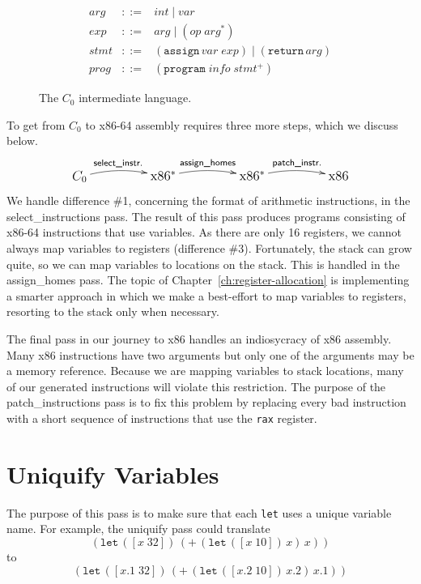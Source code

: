 \documentclass[12pt]{book}
\newcommand{\itm}[1]{\ensuremath{\mathit{#1}}}
\newcommand{\Stmt}{\itm{stmt}}
\newcommand{\Exp}{\itm{exp}}
\newcommand{\Prog}{\itm{prog}}
\newcommand{\Arg}{\itm{arg}}
\newcommand{\Int}{\itm{int}}
\newcommand{\Var}{\itm{var}}
\newcommand{\Op}{\itm{op}}
\newcommand{\key}[1]{\texttt{#1}}
\newcommand{\BINOP}[3]{(\key{#1}\,#2\,#3)}
\newcommand{\LET}[3]{(\key{let}\,([#1\;#2])\,#3)}
\newcommand{\ASSIGN}[2]{(\key{assign}\,#1\;#2)}
\newcommand{\RETURN}[1]{(\key{return}\,#1)}
\begin{document}
\begin{figure}[htbp]
\[
\begin{array}{lcl}
\Arg &::=& \Int \mid \Var \\
\Exp &::=& \Arg \mid (\Op \; \Arg^{*})\\
\Stmt &::=& \ASSIGN{\Var}{\Exp} \mid \RETURN{\Arg} \\
\Prog & ::= & (\key{program}\;\itm{info}\;\Stmt^{+})
\end{array}
\]
\caption{The $C_0$ intermediate language.}
\label{fig:c0-syntax}
\end{figure}


To get from $C_0$ to x86-64 assembly requires three more steps, which
we discuss below.
\[\large
\xymatrix@=50pt{
  C_0 \ar@/^/[r]^-{\textsf{select\_instr.}}
  & \text{x86}^{*} \ar@/^/[r]^-{\textsf{assign\_homes}} 
  & \text{x86}^{*} \ar@/^/[r]^-{\textsf{patch\_instr.}}
  & \text{x86}
}
\]
We handle difference \#1, concerning the format of arithmetic
instructions, in the \textsf{select\_instructions} pass.  The result
of this pass produces programs consisting of x86-64 instructions that
use variables.
%
As there are only 16 registers, we cannot always map variables to
registers (difference \#3). Fortunately, the stack can grow quite, so
we can map variables to locations on the stack. This is handled in the
\textsf{assign\_homes} pass. The topic of
Chapter~\ref{ch:register-allocation} is implementing a smarter
approach in which we make a best-effort to map variables to registers,
resorting to the stack only when necessary.

The final pass in our journey to x86 handles an indiosycracy of x86
assembly. Many x86 instructions have two arguments but only one of the
arguments may be a memory reference. Because we are mapping variables
to stack locations, many of our generated instructions will violate
this restriction. The purpose of the \textsf{patch\_instructions} pass
is to fix this problem by replacing every bad instruction with a short
sequence of instructions that use the \key{rax} register.

\section{Uniquify Variables}

The purpose of this pass is to make sure that each \key{let} uses a
unique variable name. For example, the \textsf{uniquify} pass could
translate
\[
\LET{x}{32}{ \BINOP{+}{ \LET{x}{10}{x} }{ x } }
\]
to
\[
\LET{x.1}{32}{ \BINOP{+}{ \LET{x.2}{10}{x.2} }{ x.1 } }
\]
\end{document}

